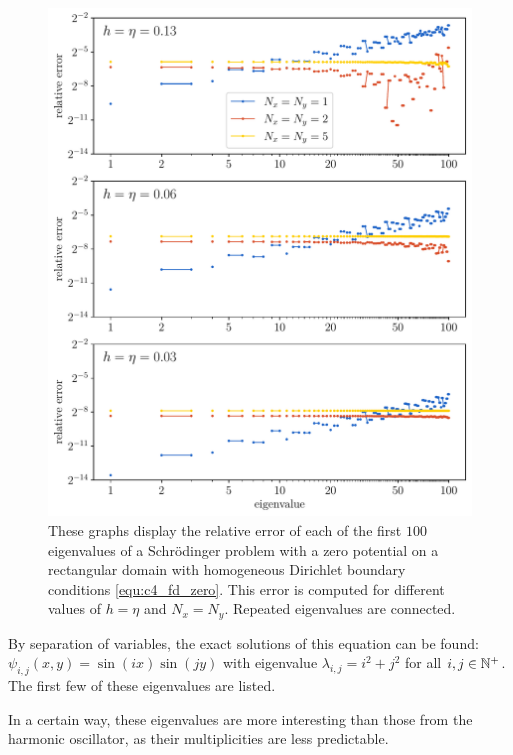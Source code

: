 \begin{figure}
    \begin{center}
        \includegraphics[width=\textwidth]{img/chapter4/fd_zero.pdf}
    \end{center}
    \caption{These graphs display the relative error of each of the first $100$ eigenvalues of a Schrödinger problem with a zero potential on a rectangular domain with homogeneous Dirichlet boundary conditions \eqref{equ:c4_fd_zero}. This error is computed for different values of $h = \eta$ and $N_x = N_y$. Repeated eigenvalues are connected.}
    \label{fig:c4_fd_zero}
\end{figure}

By separation of variables, the exact solutions of this equation can be found: $\psi_{i, j}(x, y) = \sin(i x)\sin(j y)$ with eigenvalue $\lambda_{i,j} = i^2 + j^2$ for all $i, j \in \mathbb{N}^{+}$. The first few of these eigenvalues are listed.

In a certain way, these eigenvalues are more interesting than those from the harmonic oscillator, as their multiplicities are less predictable.

